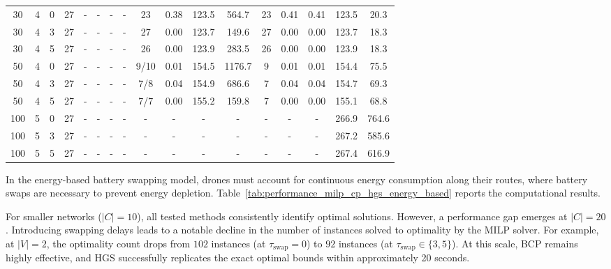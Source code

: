 \documentclass[3p, authoryear, 11pt]{elsarticle}
\begin{document}
\begin{table}[H]
\begin{tabular}{cccc cccc cccc ccccc}
    
    30 & 4 & 0 & 27 & - & - & - & - & 23 & 0.38 & 123.5 & 564.7 & 23 & 0.41 & 0.41 & 123.5 & 20.3 \\
    30 & 4 & 3 & 27 & - & - & - & - & 27 & 0.00 & 123.7 & 149.6 & 27 & 0.00 & 0.00 & 123.7 & 18.3 \\
    30 & 4 & 5 & 27 & - & - & - & - & 26 & 0.00 & 123.9 & 283.5 & 26 & 0.00 & 0.00 & 123.9 & 18.3 \\
    \midrule
    
    50 & 4 & 0 & 27 & - & - & - & - & 9/10 & 0.01 & 154.5 & 1176.7 & 9 & 0.01 & 0.01 & 154.4 & 75.5 \\
    50 & 4 & 3 & 27 & - & - & - & - & 7/8 & 0.04 & 154.9 & 686.6 & 7 & 0.04 & 0.04 & 154.7 & 69.3 \\
    50 & 4 & 5 & 27 & - & - & - & - & 7/7 & 0.00 & 155.2 & 159.8 & 7 & 0.00 & 0.00 & 155.1 & 68.8 \\
    \midrule
    
    100 & 5 & 0 & 27& - & - & - & - & - & - & - & - & - & - & - & 266.9 & 764.6 \\
    100 & 5 & 3 & 27& - & - & - & - & - & - & - & - & - & - & - & 267.2 & 585.6 \\
    100 & 5 & 5 & 27& - & - & - & - & - & - & - & - & - & - & - &267.4 & 616.9 \\
    \bottomrule
    \end{tabular}
\end{table}

In the energy-based battery swapping model, drones must account for continuous energy consumption along their routes, where battery swaps are necessary to prevent energy depletion. Table~\ref{tab:performance_milp_cp_hgs_energy_based} reports the computational results.

For smaller networks ($|C|=10$), all tested methods consistently identify optimal solutions. However, a performance gap emerges at $|C|=20$. Introducing swapping delays leads to a notable decline in the number of instances solved to optimality by the MILP solver. For example, at $|V|=2$, the optimality count drops from $102$ instances (at $\tau_{\mathrm{swap}}=0$) to $92$ instances (at $\tau_{\mathrm{swap}} \in \{3, 5\}$). At this scale, BCP remains highly effective, and HGS successfully replicates the exact optimal bounds within approximately 20 seconds.
\end{document}

